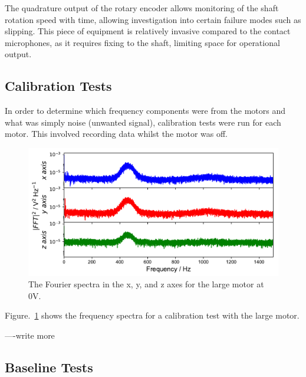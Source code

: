 The quadrature output of the rotary encoder allows monitoring of the shaft rotation speed with time, allowing investigation into certain failure modes such as slipping. This piece of equipment is relatively invasive compared to the contact microphones, as it requires fixing to the shaft, limiting space for operational output. 

\subsection{Calibration Tests}

In order to determine which frequency components were from the motors and what was simply noise (unwanted signal), calibration tests were run for each motor. This involved recording data whilst the motor was off. 

\begin{figure}[t]
    \includegraphics[width=1.0\textwidth]{fig/freq_large_0V.pdf}
    \caption[Calibration Frequency 1]{The Fourier spectra in the x, y, and z axes for the large motor at 0V.}
    \label{fig:freq_large0V}
\end{figure}

Figure.~\ref{fig:freq_large0V} shows the frequency spectra for a calibration test with the large motor. 

----write more

\subsection{Baseline Tests}


